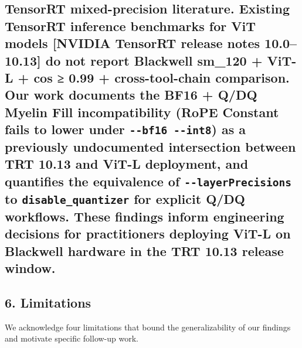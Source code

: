 \documentclass[
]{article}
\begin{document}
\subsection{\texorpdfstring{\textbf{TensorRT mixed-precision
literature.} Existing TensorRT inference benchmarks for ViT models
{[}NVIDIA TensorRT release notes 10.0--10.13{]} do not report Blackwell
sm\_120 + ViT-L + cos ≥ 0.99 + cross-tool-chain comparison. Our work
documents the BF16 + Q/DQ Myelin Fill incompatibility (RoPE Constant
fails to lower under \texttt{-\/-bf16\ -\/-int8}) as a previously
undocumented intersection between TRT 10.13 and ViT-L deployment, and
quantifies the equivalence of \texttt{-\/-layerPrecisions} to
\texttt{disable\_quantizer} for explicit Q/DQ workflows. These findings
inform engineering decisions for practitioners deploying ViT-L on
Blackwell hardware in the TRT 10.13 release
window.}{TensorRT mixed-precision literature. Existing TensorRT inference benchmarks for ViT models {[}NVIDIA TensorRT release notes 10.0--10.13{]} do not report Blackwell sm\_120 + ViT-L + cos ≥ 0.99 + cross-tool-chain comparison. Our work documents the BF16 + Q/DQ Myelin Fill incompatibility (RoPE Constant fails to lower under -\/-bf16 -\/-int8) as a previously undocumented intersection between TRT 10.13 and ViT-L deployment, and quantifies the equivalence of -\/-layerPrecisions to disable\_quantizer for explicit Q/DQ workflows. These findings inform engineering decisions for practitioners deploying ViT-L on Blackwell hardware in the TRT 10.13 release window.}}\label{tensorrt-mixed-precision-literature.-existing-tensorrt-inference-benchmarks-for-vit-models-nvidia-tensorrt-release-notes-10.010.13-do-not-report-blackwell-sm_120-vit-l-cos-0.99-cross-tool-chain-comparison.-our-work-documents-the-bf16-qdq-myelin-fill-incompatibility-rope-constant-fails-to-lower-under---bf16---int8-as-a-previously-undocumented-intersection-between-trt-10.13-and-vit-l-deployment-and-quantifies-the-equivalence-of---layerprecisions-to-disable_quantizer-for-explicit-qdq-workflows.-these-findings-inform-engineering-decisions-for-practitioners-deploying-vit-l-on-blackwell-hardware-in-the-trt-10.13-release-window.}

\subsection{6. Limitations}\label{limitations}

We acknowledge four limitations that bound the generalizability of our
findings and motivate specific follow-up work.
\end{document}
